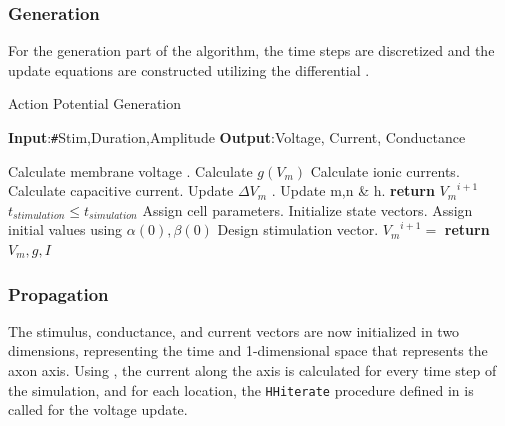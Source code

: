 \documentclass{IEEEtran}
\begin{document}
\twocolumn

\subsubsection{Generation}

For the generation part of the algorithm, the time steps are discretized and the update equations are constructed utilizing the differential .

\begin{algorithm}[h]
    \caption{Action Potential Generation}\label{alg:apgen}
    \hspace*{\algorithmicindent}\textbf{Input}:\texttt{\#}Stim,Duration,Amplitude\newline
    \hspace*{\algorithmicindent}\textbf{Output}:Voltage, Current, Conductance
    \begin{algorithmic}[1]
     \label{proc:hhiterate}
        \State Calculate membrane voltage . 
        \State Calculate $g(V_m)$ 
        \State Calculate ionic currents. 
        \State Calculate capacitive current. 
        \State Update $\Delta V_m$ .
        \State Update m,n \& h. 
        \State \textbf{return} ${V_m}^{i+1}$
    \EndProcedure \\
    
    \Ensure $t_{stimulation} \le t_{simulation}$
    \State Assign cell parameters. 
    \State Initialize state vectors. 
    \State Assign initial values using $\alpha(0),\beta(0)$ 
    \State Design stimulation vector. 
        \State ${V_m}^{i+1} =$ 
    \EndFor
    \State \textbf{return} $V_m, g, I$
    \end{algorithmic}
\end{algorithm}

\subsubsection{Propagation}

The stimulus, conductance, and current vectors are now initialized in two dimensions, representing the time and 1-dimensional space that represents the axon axis. Using , the current along the axis is calculated for every time step of the simulation, and for each location, the \texttt{HHiterate} procedure defined in  is called for the voltage update. 
\end{document}
